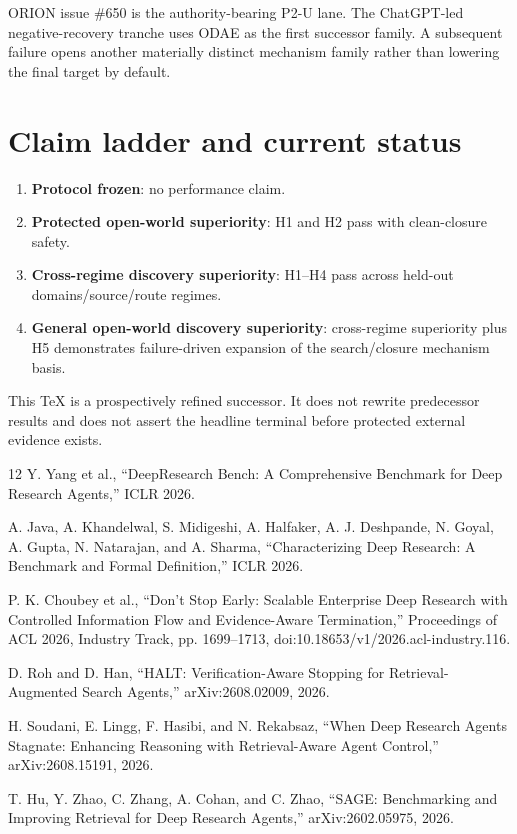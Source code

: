 \documentclass[11pt]{article}
\begin{document}
ORION issue \#650 is the authority-bearing P2-U lane. The ChatGPT-led negative-recovery tranche uses ODAE as the first successor family. A subsequent failure opens another materially distinct mechanism family rather than lowering the final target by default.

\section{Claim ladder and current status}
\begin{enumerate}
    \item \textbf{Protocol frozen}: no performance claim.
    \item \textbf{Protected open-world superiority}: H1 and H2 pass with clean-closure safety.
    \item \textbf{Cross-regime discovery superiority}: H1--H4 pass across held-out domains/source/route regimes.
    \item \textbf{General open-world discovery superiority}: cross-regime superiority plus H5 demonstrates failure-driven expansion of the search/closure mechanism basis.
\end{enumerate}
This TeX is a prospectively refined successor. It does not rewrite predecessor results and does not assert the headline terminal before protected external evidence exists.

\begin{thebibliography}{12}
Y. Yang et al., ``DeepResearch Bench: A Comprehensive Benchmark for Deep Research Agents,'' ICLR 2026.

A. Java, A. Khandelwal, S. Midigeshi, A. Halfaker, A. J. Deshpande, N. Goyal, A. Gupta, N. Natarajan, and A. Sharma, ``Characterizing Deep Research: A Benchmark and Formal Definition,'' ICLR 2026.

P. K. Choubey et al., ``Don't Stop Early: Scalable Enterprise Deep Research with Controlled Information Flow and Evidence-Aware Termination,'' Proceedings of ACL 2026, Industry Track, pp. 1699--1713, doi:10.18653/v1/2026.acl-industry.116.

D. Roh and D. Han, ``HALT: Verification-Aware Stopping for Retrieval-Augmented Search Agents,'' arXiv:2608.02009, 2026.

H. Soudani, E. Lingg, F. Hasibi, and N. Rekabsaz, ``When Deep Research Agents Stagnate: Enhancing Reasoning with Retrieval-Aware Agent Control,'' arXiv:2608.15191, 2026.

T. Hu, Y. Zhao, C. Zhang, A. Cohan, and C. Zhao, ``SAGE: Benchmarking and Improving Retrieval for Deep Research Agents,'' arXiv:2602.05975, 2026.
\end{thebibliography}
\end{document}
